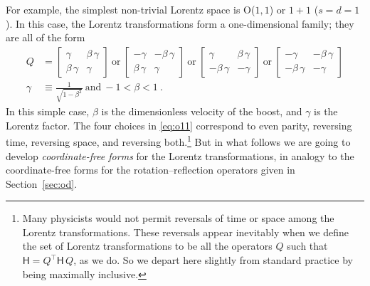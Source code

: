 \documentclass{article}
\newcommand{\metric}{\mathsf{H}}
\newcommand{\plus}{\!+\!} %
\newcommand{\secref}[1]{Section~\ref{#1}}
\begin{document}
For example, the simplest non-trivial Lorentz space is O($1,1$) or $1\plus1$ ($s=d=1$).
In this case, the Lorentz transformations form a one-dimensional family; they are all of the form
\begin{align}
    Q &= \begin{bmatrix}\gamma & \beta\,\gamma \\ \beta\,\gamma & \gamma\end{bmatrix} ~\mbox{or}~
    \begin{bmatrix}-\gamma & -\beta\,\gamma \\ \beta\,\gamma & \gamma\end{bmatrix} ~\mbox{or}~
    \begin{bmatrix}\gamma & \beta\,\gamma \\ -\beta\,\gamma & -\gamma\end{bmatrix}  ~\mbox{or}~
    \begin{bmatrix}-\gamma & -\beta\,\gamma \\ -\beta\,\gamma & -\gamma\end{bmatrix} \label{eq:o11}
    \\
    \gamma &\equiv \frac{1}{\sqrt{1 - \beta^2}} ~ \mbox{and} ~ -1 < \beta < 1 ~.\nonumber
\end{align}
In this simple case, $\beta$ is the dimensionless velocity of the boost, and $\gamma$ is the Lorentz factor.
The four choices in \eqref{eq:o11} correspond to even parity, reversing time, reversing space, and reversing both.\footnote{%
Many physicists would not permit reversals of time or space among the Lorentz transformations.
These reversals appear inevitably when we define the set of Lorentz transformations to be all the operators $Q$ such that $\metric=Q^\top\metric\,Q$, as we do.
So we depart here slightly from standard practice by being maximally inclusive.}
But in what follows we are going to develop \emph{coordinate-free forms} for the Lorentz transformations, in analogy to the coordinate-free forms for the rotation--reflection operators given in \secref{sec:od}.
\end{document}

